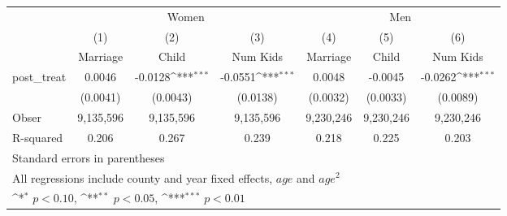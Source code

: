 \begin{table}[htbp]\centering
\def\sym#1{\ifmmode^{#1}\else\(^{#1}\)\fi}
\scriptsize
\begin{tabular}{l*{6}{c}}
\hline\hline
            &\multicolumn{3}{c}{Women}                                        &\multicolumn{3}{c}{Men}                                          \\\cmidrule(lr){2-4}\cmidrule(lr){5-7}
            &\multicolumn{1}{c}{(1)}&\multicolumn{1}{c}{(2)}&\multicolumn{1}{c}{(3)}&\multicolumn{1}{c}{(4)}&\multicolumn{1}{c}{(5)}&\multicolumn{1}{c}{(6)}\\
            &\multicolumn{1}{c}{Marriage}&\multicolumn{1}{c}{Child}&\multicolumn{1}{c}{Num Kids}&\multicolumn{1}{c}{Marriage}&\multicolumn{1}{c}{Child
            }&\multicolumn{1}{c}{Num Kids}\\
\hline
post\_treat&      0.0046         &     -0.0128\sym{***}&     -0.0551\sym{***}&      0.0048         &     -0.0045         &     -0.0262\sym{***}\\
            &    (0.0041)         &    (0.0043)         &    (0.0138)         &    (0.0032)         &    (0.0033)         &    (0.0089)         \\
\hline
Obser&   9,135,596         &   9,135,596         &   9,135,596         &   9,230,246         &   9,230,246         &   9,230,246         \\
R-squared   &       0.206         &       0.267         &       0.239         &       0.218         &       0.225         &       0.203         \\
\hline\hline
\multicolumn{7}{l}{\footnotesize Standard errors in parentheses}\\
\multicolumn{7}{l}{\footnotesize All regressions include county and year fixed effects, $age$ and $age^2$}\\
\multicolumn{7}{l}{\footnotesize \sym{*} \(p<0.10\), \sym{**} \(p<0.05\), \sym{***} \(p<0.01\)}\\
\end{tabular}
\end{table}